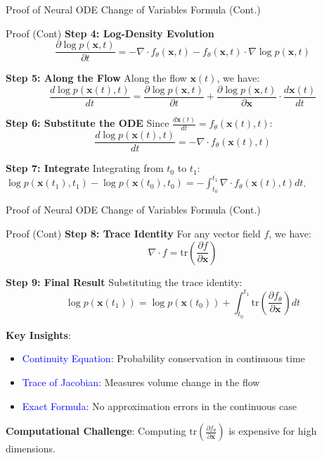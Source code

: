 \documentclass[aspectratio=169]{beamer}
\begin{document}
\begin{frame}{Proof of Neural ODE Change of Variables Formula (Cont.)}
\begin{block}{Proof (Cont)}
\small
\textbf{Step 4: Log-Density Evolution}
\begin{equation}
    \frac{\partial \log p(\mathbf{x}, t)}{\partial t} = -\nabla \cdot f_\theta(\mathbf{x}, t) - f_\theta(\mathbf{x}, t) \cdot \nabla \log p(\mathbf{x}, t)
\end{equation}

\textbf{Step 5: Along the Flow}
Along the flow $\mathbf{x}(t)$, we have:
\begin{equation}
    \frac{d \log p(\mathbf{x}(t), t)}{dt} = \frac{\partial \log p(\mathbf{x}, t)}{\partial t} + \frac{\partial \log p(\mathbf{x}, t)}{\partial \mathbf{x}} \cdot \frac{d\mathbf{x}(t)}{dt}
\end{equation}

\textbf{Step 6: Substitute the ODE}
Since $\frac{d\mathbf{x}(t)}{dt} = f_\theta(\mathbf{x}(t), t)$:
\begin{equation}
    \frac{d \log p(\mathbf{x}(t), t)}{dt} = -\nabla \cdot f_\theta(\mathbf{x}(t), t)
\end{equation}

\textbf{Step 7: Integrate}
Integrating from $t_0$ to $t_1$: $\log p(\mathbf{x}(t_1), t_1) - \log p(\mathbf{x}(t_0), t_0) = -\int_{t_0}^{t_1} \nabla \cdot f_\theta(\mathbf{x}(t), t) dt$.
\end{block}
\end{frame}

\begin{frame}{Proof of Neural ODE Change of Variables Formula (Cont.)}
\begin{block}{Proof (Cont)}
\small
\textbf{Step 8: Trace Identity}
For any vector field $f$, we have:
\begin{equation}
    \nabla \cdot f = \text{tr}\left(\frac{\partial f}{\partial \mathbf{x}}\right)
\end{equation}

\textbf{Step 9: Final Result}
Substituting the trace identity:
\begin{equation}
    \log p(\mathbf{x}(t_1)) = \log p(\mathbf{x}(t_0)) + \int_{t_0}^{t_1} \text{tr}\left(\frac{\partial f_\theta}{\partial \mathbf{x}}\right) dt
\end{equation}

\textbf{Key Insights}:
\begin{itemize}
    \item \textcolor{blue}{Continuity Equation}: Probability conservation in continuous time
    \item \textcolor{blue}{Trace of Jacobian}: Measures volume change in the flow
    \item \textcolor{blue}{Exact Formula}: No approximation errors in the continuous case
\end{itemize}

\textbf{Computational Challenge}: Computing $\text{tr}\left(\frac{\partial f_\theta}{\partial \mathbf{x}}\right)$ is expensive for high dimensions.
\end{block}
\end{frame}
\end{document}
